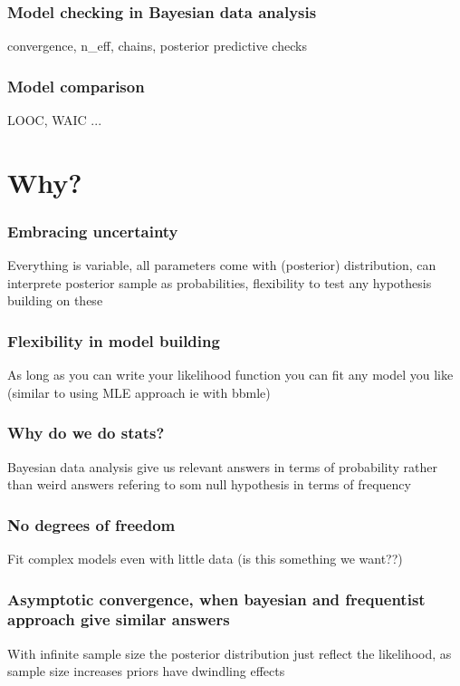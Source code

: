 \documentclass{beamer}
\begin{document}
  \begin{frame}
  \frametitle{\bf Model checking in Bayesian data analysis}
  
  convergence, n\_eff, chains, posterior predictive checks
  
 \end{frame}
 
  \begin{frame}
  \frametitle{\bf Model comparison}
  
  LOOC, WAIC ...
  
 \end{frame}
 

\section{Why?}
 
  \begin{frame}
  \frametitle{\bf Embracing uncertainty}
  
  Everything is variable, all parameters come with (posterior) distribution, can interprete posterior sample
  as probabilities, flexibility to test any hypothesis building on these
  
 \end{frame}
 
  \begin{frame}
  \frametitle{\bf Flexibility in model building}
  
  As long as you can write your likelihood function you can fit any model you like (similar to using MLE approach
  ie with bbmle)
  
 \end{frame}
 
  \begin{frame}
  \frametitle{\bf Why do we do stats?}
  
  Bayesian data analysis give us relevant answers in terms of probability rather than weird answers refering to som null hypothesis in
  terms of frequency
  
 \end{frame}
 
  \begin{frame}
  \frametitle{\bf No degrees of freedom}
  
  Fit complex models even with little data (is this something we want??)
  
 \end{frame}
 
  \begin{frame}
  \frametitle{\bf Asymptotic convergence, when bayesian and frequentist approach give similar answers}
  
  With infinite sample size the posterior distribution just reflect the likelihood, as sample size increases
  priors have dwindling effects
  
 \end{frame}
 
\end{document}
